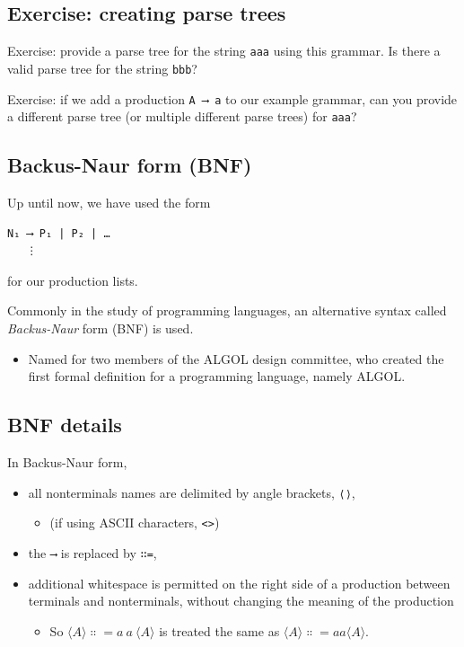 \documentclass[11pt]{article}
\theoremstyle{definition}
\begin{document}
\subsection{Exercise: creating parse trees}
\label{sec:org19b38f0}

Exercise: provide a parse tree for the string \texttt{aaa} using this grammar.
Is there a valid parse tree for the string \texttt{bbb}?

Exercise: if we add a production \texttt{A ⟶ a} to our example grammar,
can you provide a different parse tree
(or multiple different parse trees) for \texttt{aaa}?

\subsection{Backus-Naur form (BNF)}
\label{sec:org22ee5a9}

Up until now, we have used the form
\begin{verbatim}
N₁ ⟶ P₁ | P₂ | …
   ⋮
\end{verbatim}
for our production lists.

Commonly in the study of programming languages,
an alternative syntax called \emph{Backus-Naur} form (BNF)
is used.
\begin{itemize}
\item Named for two members of the ALGOL design committee,
who created the first formal definition for a programming language,
namely ALGOL.
\end{itemize}

\subsection{BNF details}
\label{sec:org658be5f}

In Backus-Naur form,
\begin{itemize}
\item all nonterminals names are delimited by
angle brackets, \texttt{⟨⟩},
\begin{itemize}
\item (if using ASCII characters, \texttt{<>})
\end{itemize}
\item the \texttt{⟶} is replaced by \texttt{∷=},
\item additional whitespace is permitted on the right side
of a production between terminals and nonterminals,
without changing the meaning of the production
\begin{itemize}
\item So \(⟨A⟩ ∷= a\ a\ ⟨A⟩\) is treated the same as \(⟨A⟩ ∷= aa⟨A⟩\).
\end{itemize}
\end{itemize}
\end{document}
